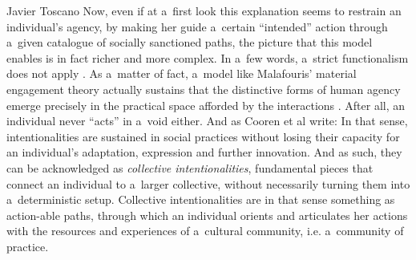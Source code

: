 \begin{artengenv}{Javier Toscano}
Now, even if at a~first look this explanation seems to restrain an individual's agency, by making her guide a~certain ``intended'' action through a~given catalogue of socially sanctioned paths, the picture that this model enables is in fact richer and more complex. In a~few words, a~strict functionalism does not apply
\parencites[][]{elster_explaining_1983}[][p.32ff]{douglas_how_1986}. %
 As a~matter of fact, a~model like Malafouris' material engagement theory actually sustains that the distinctive forms of human agency emerge precisely in the practical space afforded by the interactions 
\parencites[][]{malafouris_at_2008}[][]{malafouris_metaplasticity_2015}. %
 After all, an individual never ``acts'' in a~void either. And as Cooren et al 
\parencite*[][p.11]{cooren_communication_2006} %
 write:
 In that sense, intentionalities are sustained in social practices without losing their capacity for an individual's adaptation, expression and further innovation. And as such, they can be acknowledged as \textit{collective intentionalities}, fundamental pieces that connect an individual to a~larger collective, without necessarily turning them into a~deterministic setup. Collective intentionalities are in that sense something as action-able paths, through which an individual orients and articulates her actions with the resources and experiences of a~cultural community, i.e. a~community of practice.


\end{artengenv}
